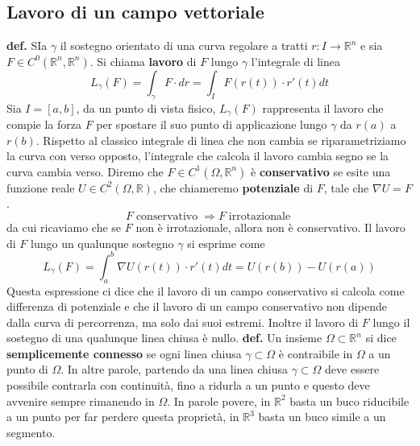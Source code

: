 \subsection*{Lavoro di un campo vettoriale}
\textbf{def.} SIa $\gamma$ il sostegno orientato di una curva regolare a tratti $r: I \rightarrow \mathbb{R}^n$ e sia $F \in C ^0(\mathbb{R}^n, \mathbb{R}^n)$. Si chiama \textbf{lavoro} di $F$ lungo $\gamma$ l'integrale di linea
\[
    L_\gamma (F) = \int_{\gamma} F \cdot dr = \int_{I} F(r(t))\cdot r'(t) dt
\]
Sia $I = [a,b]$, da un punto di vista fisico, $L_\gamma(F)$ rappresenta il lavoro che compie la forza $F$ per spostare il suo punto di applicazione lungo $\gamma$ da $r(a)$ a $r(b)$.\newline
Rispetto al classico integrale di linea che non cambia se riparametriziamo la curva con verso opposto, l'integrale che calcola il lavoro cambia segno se la curva cambia verso.\newline
\newline
Diremo che $F \in C^1(\Omega, \mathbb{R}^n)$ è \textbf{conservativo} se esite una funzione reale $U \in C^2(\Omega, \mathbb{R})$, che chiameremo \textbf{potenziale} di $F$, tale che $\nabla U = F$.\newline
\newline
\[
    F \; \text{conservativo}\; \Longrightarrow F \; \text{irrotazionale}\;
\]
da cui ricaviamo che se $F$ non è irrotazionale, allora non è conservativo.\newline
\newline
Il lavoro di $F$ lungo un qualunque sostegno $\gamma$ si esprime come
\[
    L_\gamma(F) = \int_{a}^{b}\nabla U(r(t)) \cdot r'(t) dt = U(r(b)) - U(r(a))
\]
Questa espressione ci dice che il lavoro di un campo conservativo si calcola come differenza di potenziale e che il lavoro di un campo conservativo non dipende dalla curva di percorrenza, ma solo dai suoi estremi. Inoltre il lavoro di $F$ lungo il sostegno di una qualunque linea chiusa è nullo.\newline
\newline
\textbf{def.} Un insieme $\Omega \subset \mathbb{R}^n$ si dice \textbf{semplicemente connesso} se ogni linea chiusa $\gamma \subset \Omega$ è contraibile in $\Omega$ a un punto di $\Omega$. In altre parole, partendo da una linea chiusa $\gamma \subset \Omega$ deve essere possibile contrarla con continuità, fino a ridurla a un punto e questo deve avvenire sempre rimanendo in $\Omega$.\newline
In parole povere, in $\mathbb{R}^2$ basta un buco riducibile a un punto per far perdere questa proprietà, in $\mathbb{R}^3$ basta un buco simile a un segmento.\newline
